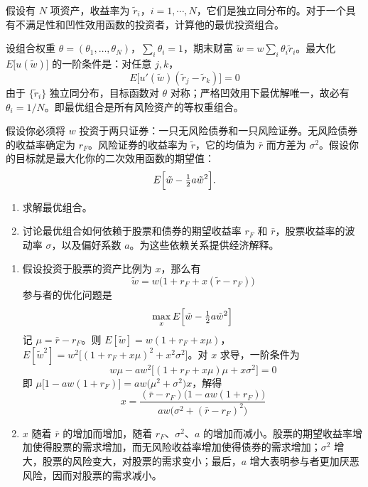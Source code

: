 
\begin{problem}
 假设有 $N$ 项资产，收益率为 $\tilde{r}_{i}$，$i=1,\cdots,N$，它们是独立同分布的。对于一个具有不满足性和凹性效用函数的投资者，计算他的最优投资组合。
\end{problem}
\begin{solution}
设组合权重 $\theta=(\theta_{1},\ldots,\theta_{N})$，$\sum_{i}\theta_{i}=1$，期末财富 $\tilde{w}=w\sum_{i}\theta_{i}\tilde{r}_{i}$。最大化 $E\bigl[u(\tilde{w})\bigr]$ 的一阶条件是：对任意 $j,k$，
\[
    E\bigl[u'(\tilde{w})(\tilde{r}_{j}-\tilde{r}_{k})\bigr]=0
\]
由于 $\{\tilde{r}_{i}\}$ 独立同分布，目标函数对 $\theta$ 对称；严格凹效用下最优解唯一，故必有 $\theta_{i}=1/N$。即最优组合是所有风险资产的等权重组合。
\end{solution}

\begin{problem}
 假设你必须将 $w$ 投资于两只证券：一只无风险债券和一只风险证券。无风险债券的收益率确定为 $r_{F}$。风险证券的收益率为 $\tilde{r}$，它的均值为 $\bar{r}$ 而方差为 $\sigma^{2}$。假设你的目标就是最大化你的二次效用函数的期望值：
\[
    E\Bigl[\tilde{w}-\tfrac12 a\tilde{w}^{2}\Bigr].
\]
\begin{enumerate}[label=(\alph*)]
    \item 求解最优组合。
    \item 讨论最优组合如何依赖于股票和债券的期望收益率 $r_{F}$ 和 $\bar{r}$，股票收益率的波动率 $\sigma$，以及偏好系数 $a$。为这些依赖关系提供经济解释。
\end{enumerate}
\end{problem}
\begin{solution}
\begin{enumerate}[label=(\alph*)]
    \item 假设投资于股票的资产比例为 $x$，那么有
    \[
        \tilde{w}=w\bigl(1+r_{F}+x(\tilde{r}-r_{F})\bigr)
    \]
    参与者的优化问题是
    \[
        \max_{x}E\Bigl[\tilde{w}-\tfrac12 a\tilde{w}^{2}\Bigr]
    \]
    记 $\mu=\bar{r}-r_{F}$。则 $E[\tilde{w}]=w(1+r_{F}+x\mu)$，$E[\tilde{w}^{2}]=w^{2}\bigl[(1+r_{F}+x\mu)^{2}+x^{2}\sigma^{2}\bigr]$。对 $x$ 求导，一阶条件为
    \[
        w\mu-aw^{2}\bigl[(1+r_{F}+x\mu)\mu+x\sigma^{2}\bigr]=0
    \]
    即 $\mu\bigl[1-aw(1+r_{F})\bigr]=aw\bigl(\mu^{2}+\sigma^{2}\bigr)x$，解得
    \[
        x=\frac{(\bar{r}-r_{F})\bigl(1-aw(1+r_{F})\bigr)}{aw\bigl(\sigma^{2}+(\bar{r}-r_{F})^{2}\bigr)}
    \]

    \item $x$ 随着 $\bar{r}$ 的增加而增加，随着 $r_{F}$、$\sigma^{2}$、$a$ 的增加而减小。股票的期望收益率增加使得股票的需求增加，而无风险收益率增加使得债券的需求增加；$\sigma^{2}$ 增大，股票的风险变大，对股票的需求变小；最后，$a$ 增大表明参与者更加厌恶风险，因而对股票的需求减小。
\end{enumerate}
\end{solution}

